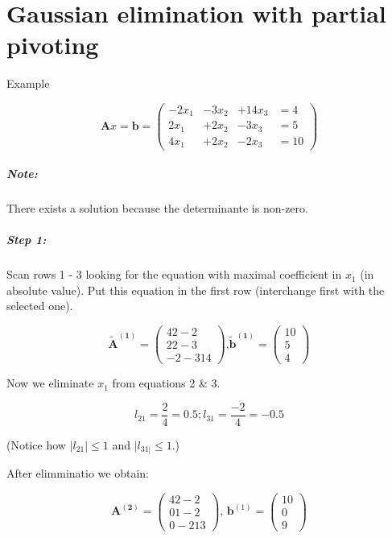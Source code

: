 \chapter{Gaussian elimination with partial pivoting}

Example %

\[ 
	\mathbf{A}x = \mathbf{b}
	=
	\begin{pmatrix}
		-2x_1 & - 3x_2 & + 14x_3 & =  4 \\
		 2x_1 & + 2x_2 & -  3x_3 & =  5 \\
		 4x_1 & + 2x_2 & -  2x_3 & = 10
	\end{pmatrix}
\]

\paragraph{Note:} 
There exists a solution because the determinante is non-zero.

\paragraph{Step 1:}
Scan rows 1 - 3 looking for the equation with maximal coefficient in \(x_1\)
(in absolute value). Put this equation in the first row (interchange first with 
the selected one).

\[
	\mathbf{\tilde{A}^{(1)}} =
	\begin{pmatrix}
 		4 2 -2 \\
 		2 2 -3 \\
 		-2 -3 14      
	\end{pmatrix} \text{,}
	\mathbf{\tilde{b}^{(1)}} =
	\begin{pmatrix}
		10 \\
		 5 \\
		 4
	\end{pmatrix}
\]

Now we eliminate \(x_1\) from equations 2 \& 3.

\[
	l_{21} = \frac{2}{4} = 0.5; l_{31} = \frac{-2}{4} = -0.5
\]

(Notice how \(|l_{21}| \leq 1\) and \(|l_{31|} \leq 1\).)

After elimminatio we obtain:

\[
	\mathbf{A^{(2)}} =
	\begin{pmatrix}
 		4  2 -2 \\
 		0  1 -2 \\
 		0 -2 13      
	\end{pmatrix} \text{, }
	\mathbf{b}^{(1)} =
	\begin{pmatrix}
		10 \\
		 0 \\
		 9
	\end{pmatrix}
\]

